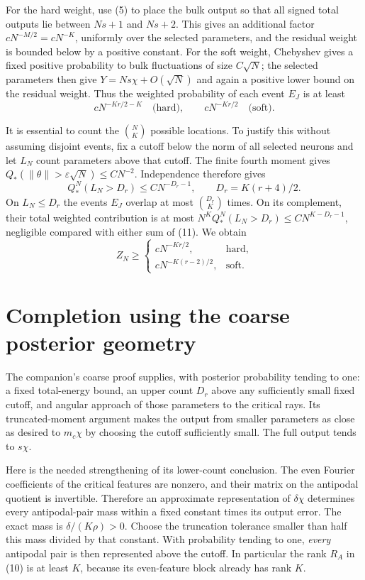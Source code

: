\documentclass[11pt]{article}
\begin{document}
For the hard weight, use (5) to place the bulk output so that all
signed total outputs lie between $Ns+1$ and $Ns+2$. This gives an
additional factor $cN^{-M/2}=cN^{-K}$, uniformly over the selected
parameters, and the residual weight is bounded below by a positive
constant. For the soft weight, Chebyshev gives a fixed positive
probability to bulk fluctuations of size $C\sqrt N$; the selected
parameters then give $Y=Ns\chi+O(\sqrt N)$ and again a positive
lower bound on the residual weight. Thus the weighted probability of
each event $E_J$ is at least
\[
 cN^{-Kr/2-K}\quad\text{(hard)},\qquad
 cN^{-Kr/2}\quad\text{(soft)}.                            \tag{11}
\]

It is essential to count the $\binom NK$ possible locations. To justify
this without assuming disjoint events, fix a cutoff below the norm of
all selected neurons and let $L_N$ count parameters above that cutoff.
The finite fourth moment gives $Q_*(\|\theta\|>\varepsilon\sqrt N)
\le CN^{-2}$. Independence therefore gives
\[
 Q_*^N(L_N>D_r)\le C N^{-D_r-1},\qquad D_r=K(r+4)/2.
\]
On $L_N\le D_r$ the events $E_J$ overlap at most $\binom{D_r}K$
times. On its complement, their total weighted contribution is at
most $N^K Q_*^N(L_N>D_r)\le C N^{K-D_r-1}$, negligible compared
with either sum of (11). We obtain
\[
 Z_N\ge
 \begin{cases}
 cN^{-Kr/2},&\text{hard},\\
 cN^{-K(r-2)/2},&\text{soft}.
 \end{cases}                                             \tag{12}
\]

\section{Completion using the coarse posterior geometry}
The companion's coarse proof supplies, with posterior probability
tending to one: a fixed total-energy bound, an upper count $D_r$ above
any sufficiently small fixed cutoff, and angular approach of those
parameters to the critical rays. Its truncated-moment argument makes
the output from smaller parameters as close as desired to $m_c\chi$
by choosing the cutoff sufficiently small. The full output tends to
$s\chi$.

Here is the needed strengthening of its lower-count conclusion.
The even Fourier coefficients of the critical features are nonzero,
and their matrix on the antipodal quotient is invertible. Therefore
an approximate representation of $\delta\chi$ determines every
antipodal-pair mass within a fixed constant times its output error.
The exact mass is $\delta/(K\rho)>0$. Choose the truncation tolerance
smaller than half this mass divided by that constant. With probability
tending to one, \emph{every} antipodal pair is then represented above
the cutoff. In particular the rank $R_A$ in (10) is at least $K$,
because its even-feature block already has rank $K$.
\end{document}
